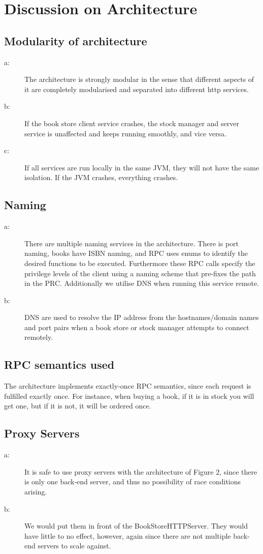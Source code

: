\chapter{Discussion on Architecture}

\section{Modularity of architecture}
\begin{description}
\item[a:] The architecture is strongly modular in the sense that different aspects of it are completely modularised and separated into different http services.
\item[b:] If the book store client service crashes, the stock manager and server service is unaffected and keeps running smoothly, and vice versa.
\item[c:] If all services are run locally in the same JVM, they will not have the same isolation. If the JVM crashes, everything crashes.
\end{description}

\section{Naming}
\begin{description}
\item[a:] There are multiple naming services in the architecture. There is port naming, books have ISBN naming, and RPC uses enums to identify the desired functions to be executed. Furthermore these RPC calls specify the privilege levels of the client using a naming scheme that pre-fixes the path in the PRC. Additionally we utilise DNS when running this service remote.
\item[b:] DNS are used to resolve the IP address from the hostnames/domain names and port pairs when a book store or stock manager attempts to connect remotely.
\end{description}

\section{RPC semantics used}
The architecture implements exactly-once RPC semantics, since each request is fulfilled exactly once. For instance, when buying a book, if it is in stock you will get one, but if it is not, it will be ordered once.

\section{Proxy Servers}
\begin{description}
\item[a:] It is safe to use proxy servers with the architecture of Figure 2, since there is only one back-end server, and thus no possibility of race conditions arising.
\item[b:] We would put them in front of the BookStoreHTTPServer. They would have little to no effect, however, again since there are not multiple back-end servers to scale against.
\end{description}

